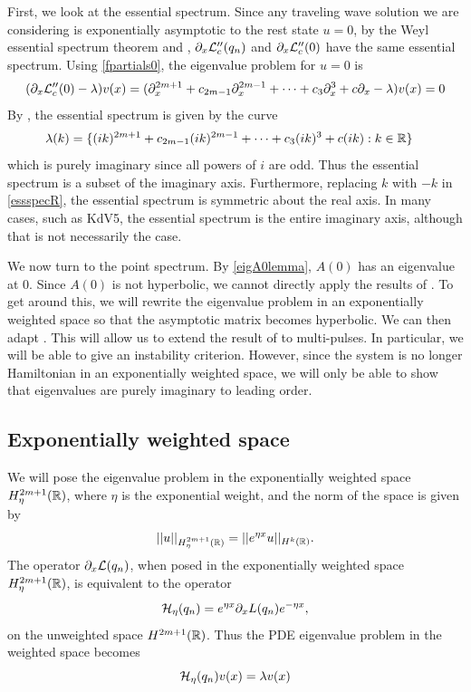 \documentclass[thesis.tex]{subfiles}
\begin{document}
First, we look at the essential spectrum. Since any traveling wave solution we are considering is exponentially asymptotic to the rest state $u = 0$, by the Weyl essential spectrum theorem \cite[Theorem 2.2.6]{Kapitula2013} and \cite[Theorem 3.1.11]{Kapitula2013}, $\partial_x \mathcal{L}_c''(q_n)$ and $\partial_x \mathcal{L}_c''(0)$ have the same essential spectrum. Using \cref{fpartials0}, the eigenvalue problem for $u = 0$ is 
\[
(\partial_x \mathcal{L}_c''(0) - \lambda )v(x) = 
(\partial_x^{2m+1} + c_{2m-1} \partial_x^{2m-1} + \dots + c_3 \partial_x^3 + c \partial_x - \lambda )v(x) = 0
\]
By \cite[(3.1.20)]{Kapitula2013}, the essential spectrum is given by the curve
\begin{align}\label{essspecR}
\lambda(k) &= \{ (ik)^{2m+1} + c_{2m-1} (ik)^{2m-1} + \dots + c_3 (ik)^3 + c (ik) : k \in \mathbb{R} \}
\end{align}
which is purely imaginary since all powers of $i$ are odd. Thus the essential spectrum is a subset of the imaginary axis. Furthermore, replacing $k$ with $-k$ in \cref{essspecR}, the essential spectrum is symmetric about the real axis. In many cases, such as KdV5, the essential spectrum is the entire imaginary axis, although that is not necessarily the case.

We now turn to the point spectrum. By \cref{eigA0lemma}, $A(0)$ has an eigenvalue at 0. Since $A(0)$ is not hyperbolic, we cannot directly apply the results of \cite{Sandstede1998}. To get around this, we will rewrite the eigenvalue problem in an exponentially weighted space so that the asymptotic matrix becomes hyperbolic. We can then adapt \cite[Theorem 2]{Sandstede1998}. This will allow us to extend the result of \cite[Theorem 2.3]{Pelinovsky2007} to multi-pulses. In particular, we will be able to give an instability criterion. However, since the system is no longer Hamiltonian in an exponentially weighted space, we will only be able to show that eigenvalues are purely imaginary to leading order.

\subsection{Exponentially weighted space}\label{sec:expwtR}

We will pose the eigenvalue problem in the exponentially weighted space $H_\eta^{2m+1}(\mathbb{R})$, where $\eta$ is the exponential weight, and the norm of the space is given by
\[
||u||_{H_\eta^{2m+1}(\mathbb{R})} = ||e^{\eta x}u||_{H^k(\mathbb{R})}.
\]
The operator $\partial_x \mathcal{L}(q_n)$, when posed in the exponentially weighted space $H_\eta^{2m+1}(\mathbb{R})$, is equivalent to the operator
\begin{equation}\label{DefHeta}
\mathcal{H}_\eta(q_n) = e^{\eta x} \partial_x L(q_n)e^{-\eta x},
\end{equation}
on the unweighted space $H^{2m+1}(\mathbb{R})$. Thus the PDE eigenvalue problem in the weighted space becomes
\begin{equation}\label{PDEeigweighted}
\mathcal{H}_\eta(q_n)v(x) = \lambda v(x)
\end{equation}
\end{document}
